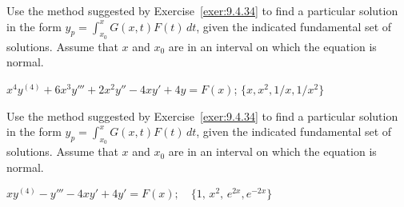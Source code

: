 \documentclass{ximera}
\begin{document}
\begin{problem}\label{exer:9.4.41}
Use the method suggested by Exercise~\ref{exer:9.4.34} to find a particular solution in the form
$y_p=\int_{x_0}^x G(x,t)F(t)\,dt$, given the indicated fundamental set of solutions.  Assume that $x$ and $x_0$ are in an interval on which
the equation is normal.

$x^4y^{(4)}+6x^3y'''+2x^2y''-4xy'+4y=F(x)$;\quad
$\{x,x^2,1/x,1/x^2\}$
\end{problem}

\begin{problem}\label{exer:9.4.42}
Use the method suggested by Exercise~\ref{exer:9.4.34} to find a particular solution in the form
$y_p=\int_{x_0}^x G(x,t)F(t)\,dt$, given the indicated fundamental set of solutions.  Assume that $x$ and $x_0$ are in an interval on which
the equation is normal.

$xy^{(4)}-y'''-4xy'+4y'=F(x); \quad \{1,\,x^2,\,e^{2x}, e^{-2x}\}$


\end{problem}
\end{document}
